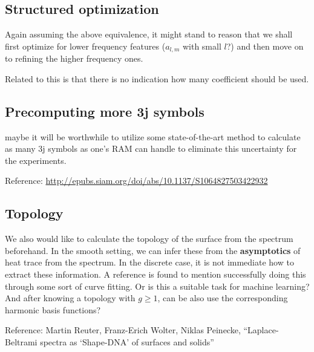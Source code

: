 \documentclass[11pt]{article}
\theoremstyle{definition}
\begin{document}

\subsection{Structured optimization}
Again assuming the above equivalence, it might stand to reason that we shall first optimize for lower frequency features ($a_{l,m}$ with small $l$?) and then move on to refining the higher frequency ones.

Related to this is that there is no indication how many coefficient should be used.

\subsection{Precomputing more 3j symbols}
maybe it will be worthwhile to utilize some state-of-the-art method to calculate as many 3j symbols as one's RAM can handle to eliminate this uncertainty for the experiments.

Reference: 
\url{http://epubs.siam.org/doi/abs/10.1137/S1064827503422932}

\subsection{Topology}
We also would like to calculate the topology of the surface from the spectrum beforehand. In the smooth setting, we can infer these from the \textbf{asymptotics} of heat trace from the spectrum. In the discrete case, it is not immediate how to extract these information. A reference is found to mention successfully doing this through some sort of curve fitting. Or is this a suitable task for machine learning? And after knowing a topology with $g\geq1$, can be also use the corresponding harmonic basis functions?

Reference: Martin Reuter, Franz-Erich Wolter, Niklas Peinecke, ``Laplace-Beltrami spectra as `Shape-DNA' of surfaces and solids''
\end{document}
